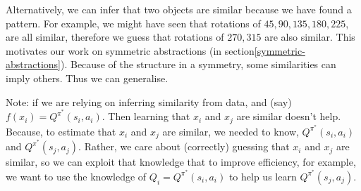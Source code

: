 \hspace{\parindent}Alternatively, we can infer that two objects are similar because we have found a pattern.
For example, we might have seen that rotations of $45, 90, 135$$, 180, 225$, are all similar,
therefore we guess that rotations of $270, 315$ are also similar.
This motivates our work on symmetric abstractions (in section\ref{symmetric-abstractions}).
Because of the structure in a symmetry, some similarities can imply others. Thus we can generalise.

Note: if we are relying on inferring similarity from data, and (say) $f(x_i) = Q^{\pi^{* }}(s_i, a_i)$.
Then learning that $x_i$ and $x_j$ are similar doesn't help.
Because, to estimate that $x_i$ and $x_j$ are similar, we needed to know, $Q^{\pi^{* }}(s_i, a_i)$ and $Q^{\pi^{* }}(s_j, a_j)$.
Rather, we care about (correctly) guessing that $x_i$ and $x_j$ are similar, so we can
exploit that knowledge that to improve efficiency,
for example, we want to use the knowledge of $Q_i = Q^{\pi^{* }}(s_i, a_i)$ to help us learn $Q^{\pi^{* }}(s_j, a_j)$.
